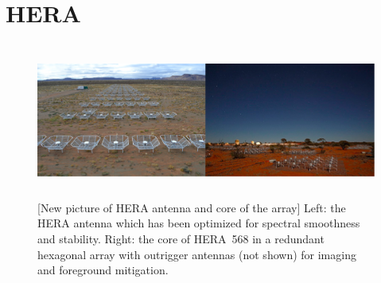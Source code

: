 \documentclass[preprint]{aastex}
\begin{document}





\vspace{-0.25in}
\section{HERA}
\label{PDsec}
\begin{figure}[t]\centering
\includegraphics[height=2in]{plots/PAPER_and_MWA.jpg}
\caption{\small
[New picture of HERA antenna and core of the array] Left: the HERA antenna which has been optimized for spectral smoothness and stability. Right: the core of HERA~568 in a redundant hexagonal array with outrigger antennas (not shown) for imaging and foreground mitigation.
}
\label{HERAfig}
\end{figure}
\end{document}
